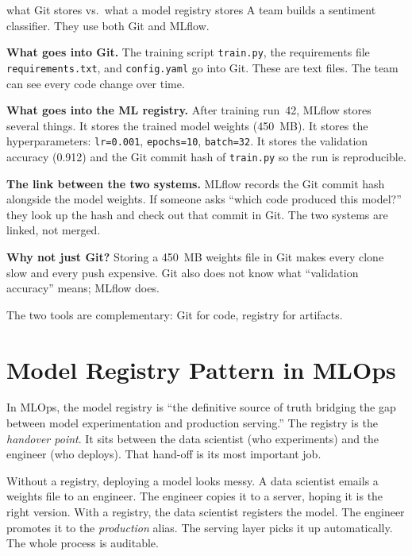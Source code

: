 \documentclass[a4paper,11pt]{article}
\begin{document}
\begin{worked}{what Git stores vs.\ what a model registry stores}
A team builds a sentiment classifier. They use both Git and MLflow.

\begin{steps}
  \item \textbf{What goes into Git.}
        The training script \texttt{train.py}, the requirements file
        \texttt{requirements.txt}, and \texttt{config.yaml} go into Git.
        These are text files. The team can see every code change over time.
  \item \textbf{What goes into the ML registry.}
        After training run~42, MLflow stores several things.
        It stores the trained model weights (450~MB).
        It stores the hyperparameters:
        \texttt{lr=0.001}, \texttt{epochs=10}, \texttt{batch=32}.
        It stores the validation accuracy (0.912) and the Git commit hash
        of \texttt{train.py} so the run is reproducible.
  \item \textbf{The link between the two systems.}
        MLflow records the Git commit hash alongside the model weights.
        If someone asks ``which code produced this model?'' they look up
        the hash and check out that commit in Git. The two systems are
        linked, not merged.
  \item \textbf{Why not just Git?}
        Storing a 450~MB weights file in Git makes every clone slow and
        every push expensive. Git also does not know what
        ``validation accuracy'' means; MLflow does.
\end{steps}
The two tools are complementary: Git for code, registry for artifacts.
\end{worked}

\section{Model Registry Pattern in MLOps}

In MLOps, the model registry is ``the definitive source of truth bridging
the gap between model experimentation and production serving.''
The registry is the \emph{handover point}.
It sits between the data scientist (who experiments) and the engineer
(who deploys). That hand-off is its most important job.

\begin{intuition}
Without a registry, deploying a model looks messy.
A data scientist emails a weights file to an engineer.
The engineer copies it to a server, hoping it is the right version.
With a registry, the data scientist registers the model.
The engineer promotes it to the \emph{production} alias. The serving layer
picks it up automatically. The whole process is auditable.
\end{intuition}
\end{document}
